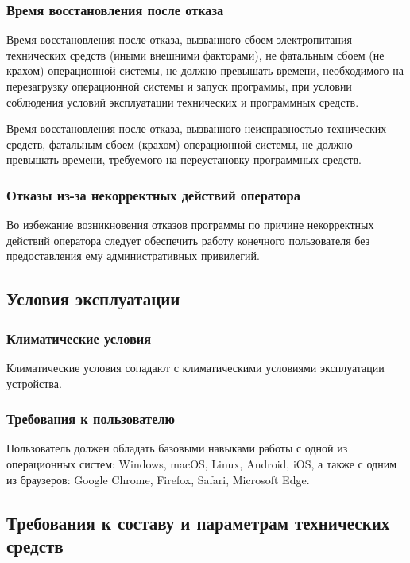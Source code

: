 \subsubsection{Время восстановления после отказа}
Время восстановления после отказа, вызванного сбоем электропитания технических средств (иными внешними факторами),
не фатальным сбоем (не крахом) операционной системы, не должно превышать времени, необходимого на перезагрузку
операционной системы и запуск программы, при условии соблюдения условий эксплуатации технических и программных средств.

Время восстановления после отказа, вызванного неисправностью технических средств, фатальным сбоем (крахом) операционной
системы, не должно превышать времени, требуемого на переустановку программных средств.

\subsubsection{Отказы из-за некорректных действий оператора}
Во избежание возникновения отказов программы по причине некорректных действий оператора следует обеспечить работу
конечного пользователя без предоставления ему административных привилегий.

\subsection{Условия эксплуатации}

\subsubsection{Климатические условия}

Климатические условия сопадают с климатическими условиями эксплуатации устройства.

\subsubsection{Требования к пользователю}

Пользователь должен обладать базовыми навыками работы с одной из операционных систем: Windows, macOS, Linux, Android,
iOS, а также с одним из браузеров: Google Chrome, Firefox, Safari, Microsoft Edge.

\subsection{Требования к составу и параметрам технических средств}

